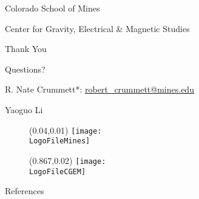 \documentclass[dark]{cgem-presentation}
\makeatletter
\newcommand{\PresentationFirstAuthor}{R. Nate Crummett}
\newcommand{\PresentationFirstAuthorEmail}{\href{robert\_crummett@mines.edu}{robert\_crummett@mines.edu}}
\newcommand{\PresentationSecondAuthor}{Yaoguo Li}
\newcommand{\PresentationAffiliationCGEM}{Center for Gravity, Electrical \& Magnetic Studies}
\newcommand{\PresentationAffiliationMines}{Colorado School of Mines}
\makeatother
\begin{document}
  \begin{frame}[plain]
    \begin{center}
      { \color{SecondColor}
        \vspace{1mm}
        \small
        \PresentationAffiliationMines{}
        \par
        \vspace{1mm}
        \Large
        \PresentationAffiliationCGEM{}
        \par
      }
      \vspace{-1mm}
      \par
      \vspace{1.5cm}
      \LARGE
      Thank You

      Questions?
      \par
      \vspace{1.95cm}
      \par
      \vspace{-8mm}
      { \color{SecondColor}
        \normalsize
        \PresentationFirstAuthor{}*: %
          \PresentationFirstAuthorEmail{}
        \par
        \PresentationSecondAuthor{}
        \par
      }
    \end{center}

    \begin{figure}
      \begin{textblock*}{1.5cm}(0.04\paperwidth,0.01\paperheight)
        \texttt{[image: \\LogoFileMines]}
      \end{textblock*}
    \end{figure}

    \begin{figure}
      \vspace*{-19.00015pt}
      \begin{textblock*}{1.35cm}(0.867\paperwidth,0.02\paperheight)
        \texttt{[image: \\LogoFileCGEM]}
      \end{textblock*}
    \end{figure}

  \end{frame}

  \begin{frame}{References}
    \printbibliography
  \end{frame}
  
\end{document}
